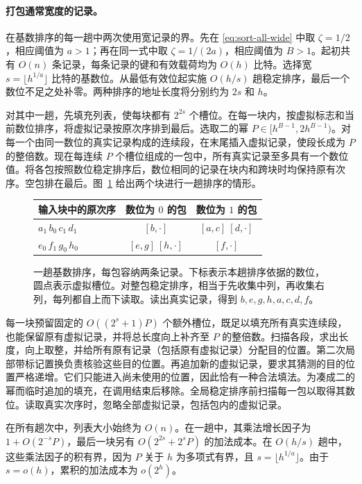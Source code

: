 \paragraph{打包通常宽度的记录。}在基数排序的每一趟中两次使用宽记录的界。先在 \eqref{eq:sort-all-wide} 中取 $\zeta=1/2$，相应阈值为 $a>1$；再在同一式中取 $\zeta=1/(2a)$，相应阈值为 $B>1$。起初共有 $O(n)$ 条记录，每条记录的键和有效载荷均为 $O(h)$ 比特。选择宽 $s=\lfloor h^{1/a}\rfloor$ 比特的基数位。从最低有效位起实施 $O(h/s)$ 趟稳定排序，最后一个数位不足之处补零。两种排序的地址长度将分别约为 $2s$ 和 $h$。

对其中一趟，先填充列表，使每块都有 $2^{2s}$ 个槽位。在每一块内，按虚拟标志和当前数位排序，将虚拟记录按原次序排到最后。选取二的幂 $P\in[h^{B-1},2h^{B-1})$。对每一个由同一数位的真实记录构成的连续段，在末尾插入虚拟记录，使段长成为 $P$ 的整倍数。现在每连续 $P$ 个槽位组成的一包中，所有真实记录至多具有一个数位值。将各包按照数位稳定排序后，数位相同的记录在块内和跨块时均保持原有次序。空包排在最后。图~\ref{fig:sort-packs} 给出两个块进行一趟排序的情形。

\begin{figure}[!hbp] \centering \begin{tabular}{@{}l@{\qquad}c@{\qquad}c@{}}
\toprule
输入块中的原次序 & 数位为 $0$ 的包 & 数位为 $1$ 的包\\
\midrule
$a_1\, b_0\, c_1\, d_1$ & $[b,\cdot]$ & $[a,c]\ [d,\cdot]$\\
$e_0\, f_1\, g_0\, h_0$ & $[e,g]\ [h,\cdot]$ & $[f,\cdot]$\\
\bottomrule
\end{tabular} \caption{一趟基数排序，每包容纳两条记录。下标表示本趟排序依据的数位，圆点表示虚拟槽位。对整包稳定排序，相当于先收集中列，再收集右列，每列都自上而下读取。读出真实记录，得到 $b,e,g,h,a,c,d,f$。} \label{fig:sort-packs} \end{figure}

每一块预留固定的 $O((2^s+1)P)$ 个额外槽位，既足以填充所有真实连续段，也能保留原有虚拟记录，并将总长度向上补齐至 $P$ 的整倍数。扫描各段，求出长度，向上取整，并给所有原有记录（包括原有虚拟记录）分配目的位置。第二次局部带标记置换负责核验这些目的位置。再追加新的虚拟记录，要求其猜测的目的位置严格递增。它们只能进入尚未使用的位置，因此恰有一种合法填法。为凑成二的幂而临时追加的填充，在调用结束后移除。全局稳定排序前扫描每一包以取得其数位。读取真实次序时，忽略全部虚拟记录，包括包内的虚拟记录。

在所有趟次中，列表大小始终为 $O(n)$。在一趟中，其乘法增长因子为 $1+O(2^{-s}P)$，最后一块另有 $O(2^{2s}+2^sP)$ 的加法成本。在 $O(h/s)$ 趟中，这些乘法因子的积有界，因为 $P$ 关于 $h$ 为多项式有界，且 $s=\lfloor h^{1/a}\rfloor$。由于 $s=o(h)$，累积的加法成本为 $o(2^h)$。

